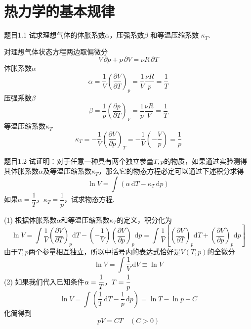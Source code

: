\section{热力学的基本规律}

\begin{question}{题目1.1}
    试求理想气体的体胀系数$\alpha$，压强系数$\beta$ 和等温压缩系数 $\kappa_T$.
\end{question}
\begin{solution}
    对理想气体状态方程两边取偏微分
    $$
        V\,\partial{p}+p\,\partial{V}=\nu R\,\partial{T}
    $$
    体胀系数$\alpha$
    $$
        \alpha=\frac{1}{V}\left(\frac{\partial V}{\partial T}\right)_p
        =\frac{1}{V}\frac{\nu R}{p}
        =\frac{1}{T}
    $$
    压强系数$\beta$
    $$
        \beta=\frac{1}{p}\left(\frac{\partial p}{\partial T}\right)_V
        =\frac{1}{p}\frac{\nu R}{V}
        =\frac{1}{T}
    $$
    等温压缩系数$\kappa_T$
    $$
        \kappa_T=-\frac{1}{V}\left(\frac{\partial V}{\partial p}\right)_T
        =-\frac{1}{V}\left(-\frac{V}{p}\right)
        =\frac{1}{p}
    $$
\end{solution}



\begin{question}{题目1.2}
    试证明：对于任意一种具有两个独立参量$T,p$的物质，如果通过实验测得其体胀系数$\alpha$及等温压缩系数$\kappa_T$，那么它的物态方程必定可以通过下述积分求得
    \begin{equation}\label{物态方程的积分形式}
        \ln{V}=\int(\alpha\,\mathrm{d}T-\kappa_T\,\mathrm{d}p)
    \end{equation}
    如果$\alpha=\dfrac{1}{T}$，$\kappa_T=\dfrac{1}{p}$，试求物态方程.
\end{question}
\begin{solution}
    (1) 根据体胀系数$\alpha$和等温压缩系数$\kappa_T$的定义，积分化为
    $$
        \ln{V}=\int\frac{1}{V}\left(\frac{\partial V}{\partial T}\right)_p\mathrm{d}T-\left(-\frac{1}{V}\right)\left(\frac{\partial V}{\partial p}\right)_p\mathrm{d}p
        =\int\frac{1}{V}\left[\left(\frac{\partial V}{\partial T}\right)_p\mathrm{d}T+\left(\frac{\partial V}{\partial p}\right)_p\mathrm{d}p\right]
    $$
    由于$T,p$两个参量相互独立，所以中括号内的表达式恰好是$V(T,p)$的全微分
    $$
        \ln{V}=\int\frac{1}{V}\,\mathrm{d}V\equiv\ln{V}
    $$
    (2) 如果我们代入已知条件$\alpha=\cfrac{1}{T}$，$T=\cfrac{1}{p}$
    $$
        \ln{V}
        =\int\left(\frac{1}{T}\,\mathrm{d}T-\frac{1}{p}\,\mathrm{d}p\right)
        =\ln{T}-\ln{p}+C
    $$
    化简得到
    $$
        pV=CT \quad (C>0)
    $$
\end{solution}



